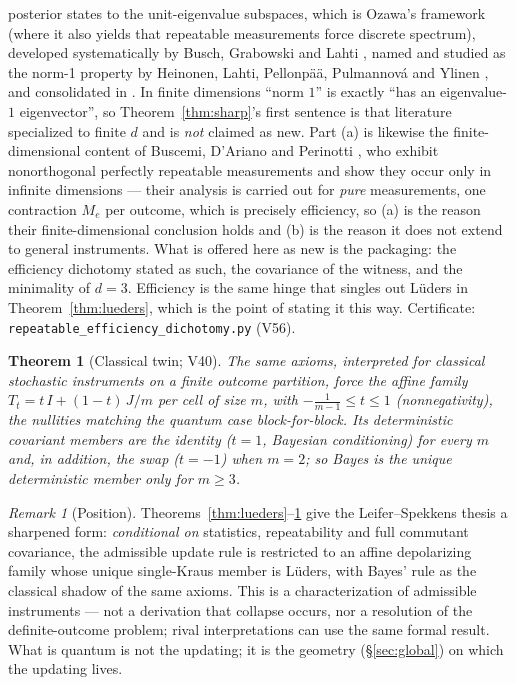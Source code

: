 \documentclass[11pt]{article}
\newtheorem{theorem}{Theorem}
\theoremstyle{definition}
\theoremstyle{remark}
\newtheorem{remark}{Remark}
\begin{document}
posterior states to the unit-eigenvalue subspaces, which is Ozawa's framework \cite{Ozawa84} (where
it also yields that repeatable measurements force discrete spectrum), developed systematically by
Busch, Grabowski and Lahti \cite{BGL95}, named and studied as the norm-1 property by Heinonen,
Lahti, Pellonp\"a\"a, Pulmannov\'a and Ylinen \cite{HLPPY03}, and consolidated in \cite{BLPY16}.
In finite dimensions ``norm $1$'' is exactly ``has an eigenvalue-$1$ eigenvector'', so
Theorem~\ref{thm:sharp}'s first sentence is that literature specialized to finite $d$ and is
\emph{not} claimed as new. Part (a) is likewise the finite-dimensional content of
Buscemi, D'Ariano and Perinotti \cite{BDP04}, who exhibit nonorthogonal perfectly repeatable
measurements and show they occur only in infinite dimensions --- their analysis is carried out for
\emph{pure} measurements, one contraction $M_e$ per outcome, which is precisely efficiency, so (a)
is the reason their finite-dimensional conclusion holds and (b) is the reason it does not extend to
general instruments. What is offered here as new is the packaging: the efficiency dichotomy stated
as such, the covariance of the witness, and the minimality of $d=3$. Efficiency is the same hinge
that singles out L\"uders in Theorem~\ref{thm:lueders}, which is the point of stating it this way.
Certificate: \texttt{repeatable\_efficiency\_dichotomy.py} (V56).

\begin{theorem}[Classical twin; V40]\label{thm:twin}
The same axioms, interpreted for classical stochastic instruments on a finite outcome
partition, force the affine family $T_t=t\,I+(1-t)\,J/m$ per cell of size $m$, with
$-\tfrac{1}{m-1}\le t\le 1$ (nonnegativity), the nullities matching the quantum case
block-for-block. Its deterministic covariant members are the identity ($t=1$, Bayesian
conditioning) for every $m$ and, in addition, the swap ($t=-1$) when $m=2$; so Bayes is the unique
deterministic member only for $m\ge 3$.
\end{theorem}

\begin{remark}[Position]
Theorems~\ref{thm:lueders}--\ref{thm:twin} give the Leifer--Spekkens thesis \cite{LS} a sharpened
form: \emph{conditional on} statistics, repeatability and full commutant covariance, the
admissible update rule is restricted to an affine depolarizing family whose unique single-Kraus
member is L\"uders, with Bayes' rule as the classical shadow of the same axioms. This is a
characterization of admissible instruments --- not a derivation that collapse occurs, nor a
resolution of the definite-outcome problem; rival interpretations can use the same formal result.
What is quantum is not the updating; it is the geometry (\S\ref{sec:global}) on which the updating
lives.
\end{remark}
\end{document}
